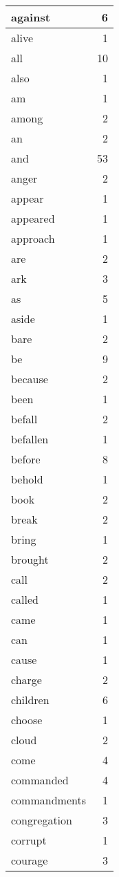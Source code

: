 \begin{center}
\begin{longtable}{l|r}
against & 6 \\ \hline
alive & 1 \\ \hline
all & 10 \\ \hline
also & 1 \\ \hline
am & 1 \\ \hline
among & 2 \\ \hline
an & 2 \\ \hline
and & 53 \\ \hline
anger & 2 \\ \hline
appear & 1 \\ \hline
appeared & 1 \\ \hline
approach & 1 \\ \hline
are & 2 \\ \hline
ark & 3 \\ \hline
as & 5 \\ \hline
aside & 1 \\ \hline
bare & 2 \\ \hline
be & 9 \\ \hline
because & 2 \\ \hline
been & 1 \\ \hline
befall & 2 \\ \hline
befallen & 1 \\ \hline
before & 8 \\ \hline
behold & 1 \\ \hline
book & 2 \\ \hline
break & 2 \\ \hline
bring & 1 \\ \hline
brought & 2 \\ \hline
call & 2 \\ \hline
called & 1 \\ \hline
came & 1 \\ \hline
can & 1 \\ \hline
cause & 1 \\ \hline
charge & 2 \\ \hline
children & 6 \\ \hline
choose & 1 \\ \hline
cloud & 2 \\ \hline
come & 4 \\ \hline
commanded & 4 \\ \hline
commandments & 1 \\ \hline
congregation & 3 \\ \hline
corrupt & 1 \\ \hline
courage & 3 \\ \hline

\end{longtable}
\end{center}
